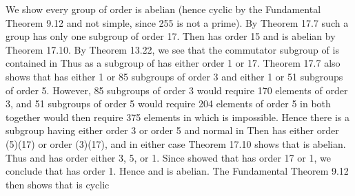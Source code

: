 \documentclass[11pt,oneside]{article}
\begin{document}
\begin{BookBody}
 We show every group of order  is abelian (hence cyclic by the Fundamental Theorem 9.12 and not simple, since 255 is not a prime). By Theorem 17.7 such a group  has only one subgroup  of order 17. Then  has order 15 and is abelian 
by Theorem 17.10. By Theorem 13.22, we see that the commutator subgroup  of  is contained in  Thus as a subgroup of  has either order 1 or 17. Theorem 17.7 also shows that  has either 1 or 85 subgroups of order 3 and either 1 or 51 subgroups of order 5. However, 85 subgroups of order 3 would require 170 elements of order 3, and 51 subgroups of order 5 would require 204 elements of order 5 in  both together would then require 375 elements in  which is impossible. Hence there is a subgroup  having either order 3 or order 5 and normal in  Then  has either order (5)(17) or order (3)(17), and in either case Theorem 17.10 shows that  is abelian. Thus  and has order either 3, 5, or 1. Since  showed that  has order 17 or 1, we conclude that  has order 1. Hence  and  is abelian. The Fundamental Theorem 9.12 then shows that  is cyclic\BookEnd{\blacktriangle}

\end{BookBody}

\BookNarrativetrue

\begin{BookBody}

\end{BookBody}

\BookNarrativefalse
\end{document}
